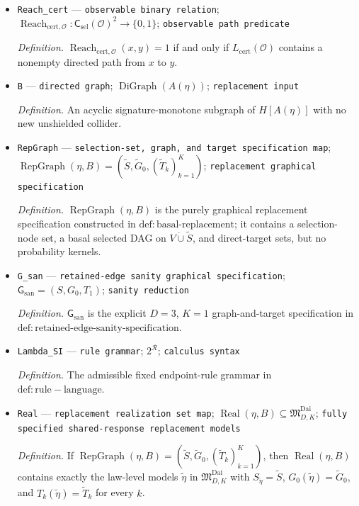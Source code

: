 \documentclass{article}
\begin{document}
\begin{itemize}
  \item \texttt{Reach\_\allowbreak{}cert} --- \texttt{observable binary relation}; \(\operatorname{Reach}_{\mathrm{cert},\mathcal O}:\mathsf C_{\mathrm{sel}}(\mathcal O)^2\to\{0,1\}\); \texttt{observable path predicate}
  \par\smallskip\noindent\emph{Definition.} \(\operatorname{Reach}_{\mathrm{cert},\mathcal O}(x,y)=1\) if and only if \(L_{\mathrm{cert}}(\mathcal O)\) contains a nonempty directed path from \(x\) to \(y\).
  \item \texttt{B} --- \texttt{directed graph}; \(\operatorname{DiGraph}(A(\eta))\); \texttt{replacement input}
  \par\smallskip\noindent\emph{Definition.} An acyclic signature-monotone subgraph of \(H[A(\eta)]\) with no new unshielded collider.
  \item \texttt{RepGraph} --- \texttt{selection-\allowbreak{}set,\allowbreak{} graph,\allowbreak{} and target specification map}; \(\operatorname{RepGraph}(\eta,B)=(\widetilde S,\widetilde G_0,(\widetilde T_k)_{k=1}^{K})\); \texttt{replacement graphical specification}
  \par\smallskip\noindent\emph{Definition.} \(\operatorname{RepGraph}(\eta,B)\) is the purely graphical replacement specification constructed in \(\mathrm{def:basal\mbox{-}replacement}\); it contains a selection-node set, a basal selected DAG on \(V\dot\cup\widetilde S\), and direct-target sets, but no probability kernels.
  \item \texttt{G\_\allowbreak{}san} --- \texttt{retained-\allowbreak{}edge sanity graphical specification}; \(\mathsf G_{\mathrm{san}}=(S,G_0,T_1)\); \texttt{sanity reduction}
  \par\smallskip\noindent\emph{Definition.} \(\mathsf G_{\mathrm{san}}\) is the explicit \(D=3\), \(K=1\) graph-and-target specification in \(\mathrm{def:retained\mbox{-}edge\mbox{-}sanity\mbox{-}specification}\).
  \item \texttt{Lambda\_\allowbreak{}SI} --- \texttt{rule grammar}; \(2^{\mathcal R}\); \texttt{calculus syntax}
  \par\smallskip\noindent\emph{Definition.} The admissible fixed endpoint-rule grammar in \(\mathrm{def:rule-language}\).
  \item \texttt{Real} --- \texttt{replacement realization set map}; \(\operatorname{Real}(\eta,B)\subseteq\mathfrak M_{D,K}^{\mathrm{Dai}}\); \texttt{fully specified shared-\allowbreak{}response replacement models}
  \par\smallskip\noindent\emph{Definition.} If \(\operatorname{RepGraph}(\eta,B)=(\widetilde S,\widetilde G_0,(\widetilde T_k)_{k=1}^{K})\), then \(\operatorname{Real}(\eta,B)\) contains exactly the law-level models \(\widetilde\eta\) in \(\mathfrak M_{D,K}^{\mathrm{Dai}}\) with \(S_{\widetilde\eta}=\widetilde S\), \(G_0(\widetilde\eta)=\widetilde G_0\), and \(T_k(\widetilde\eta)=\widetilde T_k\) for every \(k\).

\end{itemize}
\end{document}
